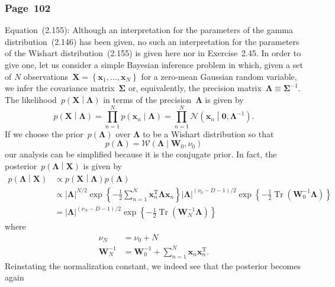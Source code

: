 \documentclass[12pt,a4paper]{article}
\newcommand{\erratum}[1]{\subsubsection*{#1}}
\begin{document}
\erratum{Page~102}
Equation~(2.155):
Although an interpretation for the parameters of the gamma distribution~(2.146) has been given,
no such an interpretation for the parameters of the Wishart distribution~(2.155) is given here
nor in Exercise~2.45.
In order to give one, let us consider a simple Bayesian inference problem in which,
given a set of $N$ observations~$\mathbf{X} =
\left\{ \mathbf{x}_1, \dots, \mathbf{x}_N \right\}$ for a zero-mean Gaussian random variable,
we infer the covariance matrix~$\bm{\Sigma}$ or, equivalently,
the precision matrix~$\bm{\Lambda} \equiv \bm{\Sigma}^{-1}$.
The likelihood~$p\left(\mathbf{X}\middle|\bm{\Lambda}\right)$
in terms of the precision~$\bm{\Lambda}$ is given by
\begin{equation}
p\left(\mathbf{X}\middle|\bm{\Lambda}\right) =
\prod_{n=1}^{N} p\left(\mathbf{x}_n\middle|\bm{\Lambda}\right) =
\prod_{n=1}^{N} \mathcal{N}\left(\mathbf{x}_n\middle|\mathbf{0}, \bm{\Lambda}^{-1}\right) .
\end{equation}
If we choose the prior~$p\left(\bm{\Lambda}\right)$ over $\bm{\Lambda}$ to be
a Wishart distribution so that
\begin{equation}
p\left(\bm{\Lambda}\right) = \mathcal{W}\left(\bm{\Lambda}\middle|\mathbf{W}_0, \nu_0\right)
\label{eq:wishart_prior}
\end{equation}
our analysis can be simplified because it is the conjugate prior.
In fact, the posterior~$p\left(\bm{\Lambda}\middle|\mathbf{X}\right)$ is given by
\begin{align}
p\left(\bm{\Lambda}\middle|\mathbf{X}\right) &\propto
p\left(\mathbf{X}\middle|\bm{\Lambda}\right) p\left(\bm{\Lambda}\right) \\
&\propto \left|\bm{\Lambda}\right|^{N/2}
\exp\left\{-\frac{1}{2}\sum_{n=1}^{N}\mathbf{x}_n^{\operatorname{T}}\bm{\Lambda}\mathbf{x}_n\right\}
\left|\bm{\Lambda}\right|^{(\nu_0 - D - 1)/2}
\exp\left\{-\frac{1}{2}\operatorname{Tr}\left(\mathbf{W}_0^{-1}\bm{\Lambda}\right)\right\} \\
&= \left|\bm{\Lambda}\right|^{(\nu_N - D - 1)/2}
\exp\left\{-\frac{1}{2}\operatorname{Tr}\left(\mathbf{W}_N^{-1}\bm{\Lambda}\right)\right\}
\end{align}
where
\begin{align}
\nu_N &= \nu_0 + N \\
\mathbf{W}_N^{-1} &=
\mathbf{W}_0^{-1} + \sum_{n=1}^{N}\mathbf{x}_n\mathbf{x}_n^{\operatorname{T}} .
\end{align}
Reinstating the normalization constant, we indeed see that the posterior becomes again
\end{document}
